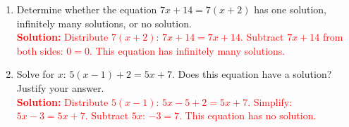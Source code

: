\documentclass[11pt]{article}
\begin{document}
\begin{tcolorbox}[colframe=black!60, colback=white, 
coltitle=black, colbacktitle=black!15, fonttitle=\bfseries\Large, 
title=Exercises, halign title=center, left=10pt, right=10pt, top=10pt, bottom=20pt]
\begin{enumerate}[itemsep=1em]
    \item Determine whether the equation \(7x + 14 = 7(x+2)\) has one solution, infinitely many solutions, or no solution.\\
    \textcolor{red}{\textbf{Solution:} Distribute \(7(x+2)\): \(7x + 14 = 7x + 14\). Subtract \(7x + 14\) from both sides: \(0 = 0\). This equation has infinitely many solutions.}

    \item Solve for \(x\): \(5(x - 1) + 2 = 5x + 7\). Does this equation have a solution? Justify your answer.\\
    \textcolor{red}{\textbf{Solution:} Distribute \(5(x-1)\): \(5x - 5 + 2 = 5x + 7\). Simplify: \(5x - 3 = 5x + 7\). Subtract \(5x\): \(-3 = 7\). This equation has no solution.}
\end{enumerate}
\end{tcolorbox}

\vspace{1em}
\end{document}
